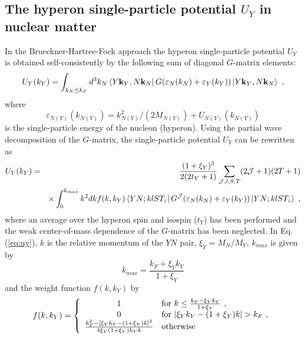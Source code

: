 \subsection{The hyperon single-particle potential $U_{Y}$ in nuclear matter}

In the Brueckner-Hartree-Fock approach 
the hyperon single-particle potential $U_{Y}$ is obtained
self-consistently by the following sum of
diagonal $G$-matrix elements:
\begin{equation}
     U_{Y}(k_{Y})=
   \int_{k_{N}\leq k_{F}}d^3k_{N}\left\langle Y{\bf k}_{Y},N{\bf k}_{N}\right
| G(\varepsilon_N(k_N)+\varepsilon_{Y}(k_Y))\left | Y{\bf
k}_{Y},N{\bf k}_{N}\right\rangle \ ,  
\end{equation} 
where 
\begin{equation}
\varepsilon_{N(Y)} (k_{N(Y)}) = k_{N(Y)}^2/(2 M_{N(Y)}) +
U_{N(Y)}(k_{N(Y)})
\label{eq:binding}
\end{equation}
is
the single-particle energy of the nucleon (hyperon). Using the
partial wave decomposition of the $G$-matrix, the single-particle 
potential $U_Y$  can be rewritten as
\begin{eqnarray}
   U_{Y}(k_{Y})&=&
\frac{(1+\xi_{Y})^3}{2(2t_{Y}+1)}\sum_{{\cal J},l,S,T}(2{\cal J}+1)(2T+1) 
\nonumber \\
& & \times \int_{0}^{k_{max}}k^2dk f(k,k_{Y})
   \left\langle Y N; k lST_z\right | G^{\cal J}(\varepsilon_N(k_N)+\varepsilon_{Y}(k_Y))\left | 
Y N; klST_z\right\rangle  \ ,
\label{eq:uy}
\end{eqnarray}
where an average over the hyperon spin and isospin ($t_Y$) has been performed and the weak center-of-mass
dependence of the $G$-matrix has been neglected.
In Eq. (\ref{eq:uy}), $k$ is the relative momentum of the $YN$ pair, 
$\xi_Y=M_N/M_Y$, $k_{max}$ is given by
\begin{equation}
   k_{max} = \frac{k_{F}+\xi_{Y}k_{Y}}{1+\xi_{Y}} \nonumber  
\end{equation}
and the weight function $f(k,k_Y)$ by 
\begin{equation}
f(k,k_{Y})= \left\{ \begin{array}{cl} 1 & \mbox{for $ k\leq
\frac{k_{F}-\xi_{Y}k_{Y}}{1+\xi_{Y}} $ }, \\ 0 & \mbox{for $
|\xi_{Y}k_{Y}-(1+\xi_{Y})k| > k_{F} $ }, \\
\frac{k_{F}^2-[\xi_{Y}k_{Y}-(1+\xi_{Y})k]^2}{4\xi_{Y}(1+\xi_{Y})k_{Y}k
} & \mbox{otherwise} 

\end{array} \right. \nonumber 
\end{equation} 


